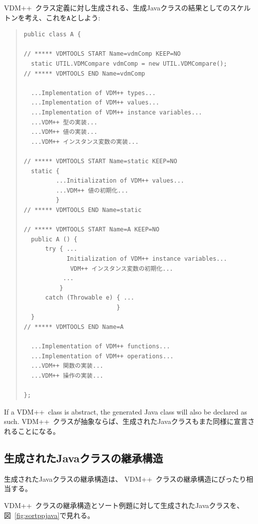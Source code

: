 \documentclass[\pformat,11pt]{jarticle}
\newcommand{\VDM}{VDM++}
\begin{document}
\VDM\ クラス定義に対し生成される、生成Javaクラスの結果としてのスケルトンを考え、これを{\tt A}としよう:

\begin{quote}
\begin{verbatim}
public class A {

// ***** VDMTOOLS START Name=vdmComp KEEP=NO
  static UTIL.VDMCompare vdmComp = new UTIL.VDMCompare();
// ***** VDMTOOLS END Name=vdmComp

  ...Implementation of VDM++ types...
  ...Implementation of VDM++ values...
  ...Implementation of VDM++ instance variables...
  ...VDM++ 型の実装...
  ...VDM++ 値の実装...
  ...VDM++ インスタンス変数の実装...

// ***** VDMTOOLS START Name=static KEEP=NO
  static {
         ...Initialization of VDM++ values...
         ...VDM++ 値の初期化...
         }
// ***** VDMTOOLS END Name=static

// ***** VDMTOOLS START Name=A KEEP=NO
  public A () {
      try { ...
            Initialization of VDM++ instance variables...
             VDM++ インスタンス変数の初期化...
           ...
          }
      catch (Throwable e) { ...
                          }
  }
// ***** VDMTOOLS END Name=A

  ...Implementation of VDM++ functions...
  ...Implementation of VDM++ operations...
  ...VDM++ 関数の実装...
  ...VDM++ 操作の実装...

};
\end{verbatim}
\end{quote}

If a \VDM\ class is abstract, the generated Java class
will also be declared as such.
 \VDM\ クラスが抽象ならば、生成されたJavaクラスもまた同様に宣言されることになる。

\subsection{生成されたJavaクラスの継承構造}
\label{inheritance}
生成されたJavaクラスの継承構造は、 \VDM\ クラスの継承構造にぴったり相当する。

 \VDM\ クラスの継承構造とソート例題に対して生成されたJavaクラスを、図~\ref{fig:sortppjava}で見れる。
\end{document}
